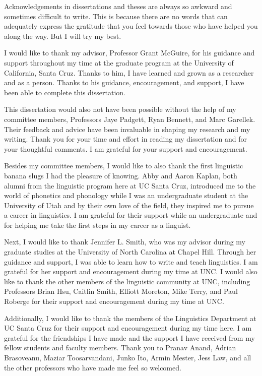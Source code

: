 \begin{acknowledgements}
    Acknowledgements in dissertations and theses are always so awkward and sometimes difficult to write. This is because there are no words that can adequately express the gratitude that you feel towards those who have helped you along the way. But I will try my best.
    
    I would like to thank my advisor, Professor Grant McGuire, for his guidance and support throughout my time at the graduate program at the University of California, Santa Cruz. Thanks to him, I have learned and grown as a researcher and as a person. Thanks to his guidance, encouragement, and support, I have been able to complete this dissertation. 

    This dissertation would also not have been possible without the help of my committee members, Professors Jaye Padgett, Ryan Bennett, and Marc Garellek. Their feedback and advice have been invaluable in shaping my research and my writing. Thank you for your time and effort in reading my dissertation and for your thoughtful comments. I am grateful for your support and encouragement. 

    Besides my committee members, I would like to also thank the first linguistic banana slugs I had the pleasure of knowing. Abby and Aaron Kaplan, both alumni from the linguistic program here at UC Santa Cruz, introduced me to the world of phonetics and phonology while I was an undergraduate student at the University of Utah and by their own love of the field, they inspired me to pursue a career in linguistics. I am grateful for their support while an undergraduate and for helping me take the first steps in my career as a linguist.

    Next, I would like to thank Jennifer L. Smith, who was my advisor during my graduate studies at the University of North Carolina at Chapel Hill. Through her guidance and support, I was able to learn how to write and teach linguistics. I am grateful for her support and encouragement during my time at UNC. I would also like to thank the other members of the linguistic community at UNC, including Professors Brian Hsu, Caitlin Smith, Elliott Moreton, Mike Terry, and Paul Roberge for their support and encouragement during my time at UNC.

    Additionally, I would like to thank the members of the Linguistics Department at UC Santa Cruz for their support and encouragement during my time here. I am grateful for the friendships I have made and the support I have received from my fellow students and faculty members. Thank you to Pranav Anand, Adrian Brasoveanu, Maziar Toosarvandani, Junko Ito, Armin Mester, Jess Law, and all the other professors who have made me feel so welcomed.
    

\end{acknowledgements}
